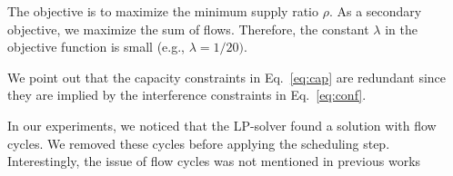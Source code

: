 \documentclass[12pt]{article}
\newenvironment{proof sketch}[1]{\noindent {\emph{Proof sketch of #1:}}}{\hfill \qed}
\newcommand{\algA}{\textsc{MF-I-S}}
\begin{document}
The objective is to maximize the minimum supply ratio $\rho$.  As a
secondary objective, we maximize the sum of flows.
Therefore, the constant $\lambda$ in the objective function is small
(e.g., $\lambda=1/20)$.

We point out that the capacity constraints in Eq.~\ref{eq:cap} are
redundant since they are implied by the interference constraints in
Eq.~\ref{eq:conf}.

In our experiments, we noticed that the LP-solver found a solution
with flow cycles. We removed these cycles before applying the
scheduling step.  Interestingly, the issue of flow cycles was not
mentioned in previous
works~\cite{alicherry2005joint11,buragohain2007improved}

\end{document}

